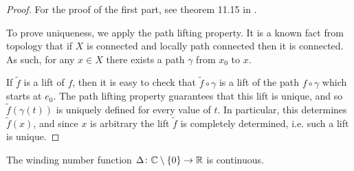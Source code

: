 \begin{proof}
For the proof of the first part, see theorem 11.15 in \cite{leetopological}.

To prove uniqueness, we apply the path lifting property. It is a known fact from topology that if $X$ is connected and locally path connected then it is connected. As such, for any $x \in X$ there exists a path $\gamma$ from $x_0$ to $x$.

If $\tilde f$ is a lift of $f$, then it is easy to check that $\tilde f \circ \gamma$ is a lift of the path $f \circ \gamma$ which starts at $e_0$. The path lifting property guarantees that this lift is unique, and so $\tilde f(\gamma(t))$ is uniquely defined for every value of $t$. In particular, this determines $\tilde f(x)$, and since $x$ is arbitrary the lift $\tilde f$ is completely determined, i.e. such a lift is unique.
\end{proof}

\begin{prop}\label{deltacontinuous}
The winding number function $\Delta \colon \mathbb{C} \setminus \{0\} \to \mathbb{R}$ is continuous.
\end{prop}

